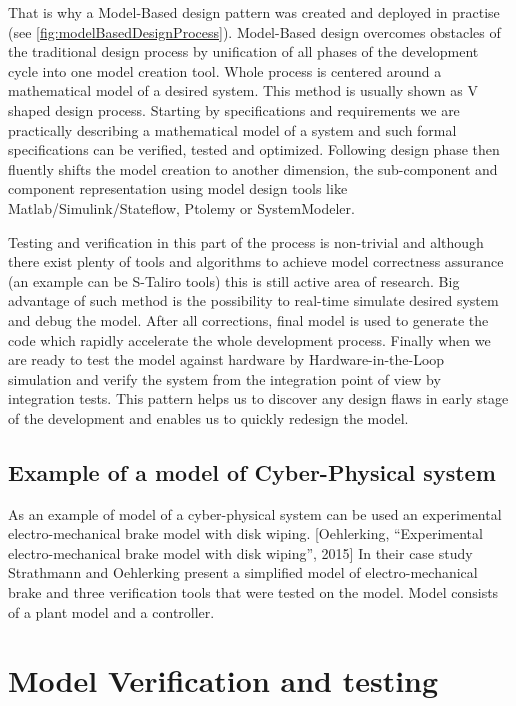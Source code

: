 \documentclass[english,technical,10pt]{FITreport}[2018/01/26]
\begin{document}
That is why a Model-Based design pattern was created and deployed in practise (see \ref{fig:modelBasedDesignProcess}). Model-Based design overcomes obstacles of the traditional design process by unification of all phases of the development cycle into one model creation tool. Whole process is centered around a mathematical model of a desired system. This method is usually shown as V shaped design process. Starting by specifications and requirements we are practically describing a mathematical model of a system and such formal specifications can be verified, tested and optimized. Following design phase then fluently shifts the model creation to another dimension, the sub-component and component representation using model design tools like Matlab/Simulink/Stateflow, Ptolemy or SystemModeler.

Testing and verification in this part of the process is non-trivial and although there exist plenty of tools and algorithms to achieve model correctness assurance (an example can be S-Taliro tools) this is still active area of research. Big advantage of such method is the possibility to real-time simulate desired system and debug the model. After all corrections, final model is used to generate the code which rapidly accelerate the whole development process. Finally when we are ready to test the model against hardware by Hardware-in-the-Loop simulation and verify the system from the integration point of view by integration tests. This pattern helps us to discover any design flaws in early stage of the development and enables us to quickly redesign the model.

\subsection{Example of a model of Cyber-Physical system}

As an example of model of a cyber-physical system can be used an experimental electro-mechanical brake model with disk wiping. [Oehlerking, “Experimental electro-mechanical brake model with disk wiping”, 2015] In their case study Strathmann and Oehlerking present a simplified model of electro-mechanical brake and three verification tools that were tested on the model. Model consists of a plant model and a controller.

\section{Model Verification and testing}
\end{document}
